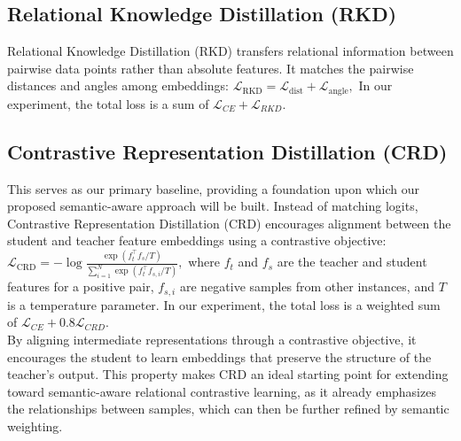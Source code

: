 \documentclass{article}
\begin{document}
\subsection{Relational Knowledge Distillation (RKD)}
Relational Knowledge Distillation (RKD) \citep{rkd_park2019relational} transfers relational information between pairwise data points 
rather than absolute features. It matches the pairwise distances and angles among embeddings:
$
\mathcal{L}_{\text{RKD}} = \mathcal{L}_{\text{dist}} + \mathcal{L}_{\text{angle}},
$
In our experiment, the total loss is a sum of $\mathcal{L}_{CE} + \mathcal{L}_{RKD}$.

\subsection{Contrastive Representation Distillation (CRD)}
This serves as our primary baseline, providing a foundation upon which our proposed semantic-aware approach will be built. Instead of matching logits, Contrastive Representation Distillation (CRD) \citep{crd_tian2022contrastiverepresentationdistillation} encourages alignment between the student and teacher feature embeddings 
using a contrastive objective:
$
\mathcal{L}_{\text{CRD}} = - \log 
\frac{\exp(f_t^\top f_s / T)}{\sum_{i=1}^{N} \exp(f_t^\top f_{s,i} / T)},
$
where $f_t$ and $f_s$ are the teacher and student features for a positive pair, 
$f_{s,i}$ are negative samples from other instances, and $T$ is a temperature parameter. 
In our experiment, the total loss is a weighted sum of $\mathcal{L}_{CE} + 0.8\mathcal{L}_{CRD}$.\\
By aligning intermediate representations through a contrastive objective, it encourages the student to learn  embeddings that preserve the structure of the teacher's output. This property makes CRD an ideal starting point for extending toward semantic-aware relational contrastive learning, as it already emphasizes the relationships between samples, which can then be further refined by semantic weighting.
\end{document}
